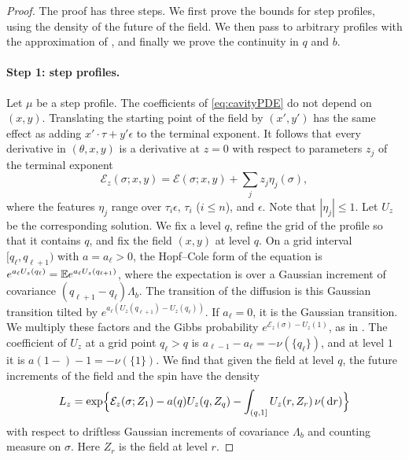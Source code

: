 \begin{proof}
The proof has three steps. We first prove the bounds for step profiles,
using the density of the future of the field. We then pass to arbitrary
profiles with the approximation of \cite[Section~2.6]{AL}, and finally
we prove the continuity in $q$ and $b$.

\paragraph{Step 1: step profiles.}
Let $\mu$ be a step profile. The coefficients of \eqref{eq:cavityPDE} do
not depend on $(x,y)$. Translating the starting point of the field by
$(x',y')$ has the same effect as adding
$x'\cdot\tau+y'\epsilon$ to the terminal exponent. It follows that every
derivative in $(\theta,x,y)$ is a derivative at $z=0$ with respect to
parameters $z_j$ of the terminal exponent
\[
 \mathcal E_z(\sigma;x,y)=\mathcal E(\sigma;x,y)+\sum_jz_j\eta_j(\sigma),
\]
where the features $\eta_j$ range over $\tau_i\epsilon$, $\tau_i$
($i\le n$), and $\epsilon$. Note that $|\eta_j|\le1$. Let $U_z$ be the
corresponding solution. We fix a level $q$, refine the grid of the profile
so that it contains $q$, and fix the field $(x,y)$ at level $q$. On a
grid interval $[q_\ell,q_{\ell+1})$ with $a=a_\ell>0$, the Hopf--Cole form
of the equation is $e^{a_\ell U_z(q_\ell)}=\mathbb E e^{a_\ell U_z(q_{\ell+1})}$,
where the expectation is over a Gaussian increment of covariance
$(q_{\ell+1}-q_\ell)\Lambda_b$. The transition of the diffusion is this
Gaussian transition tilted by $e^{a_\ell(U_z(q_{\ell+1})-U_z(q_\ell))}$.
If $a_\ell=0$, it is the Gaussian transition. We multiply these factors
and the Gibbs probability $e^{\mathcal E_z(\sigma)-U_z(1)}$, as in
\cite[Section~2.1, (2.1)]{AL}. The coefficient of $U_z$ at a grid point
$q_\ell>q$ is $a_{\ell-1}-a_\ell=-\nu(\{q_\ell\})$, and at level $1$ it is
$a(1-)-1=-\nu(\{1\})$. We find that given the field at level $q$, the
future increments of the field and the spin have the density
\begin{equation}\label{eq:tree-future-density}
 L_z=\exp\Bigl\{\mathcal E_z(\sigma;Z_1)-a(q)U_z(q,Z_q)
     -\int_{(q,1]}U_z(r,Z_r)\,\nu(\,\mathrm d r)\Bigr\}
\end{equation}
with respect to driftless Gaussian increments of covariance $\Lambda_b$
and counting measure on $\sigma$. Here $Z_r$ is the field at level $r$.


\end{proof}
